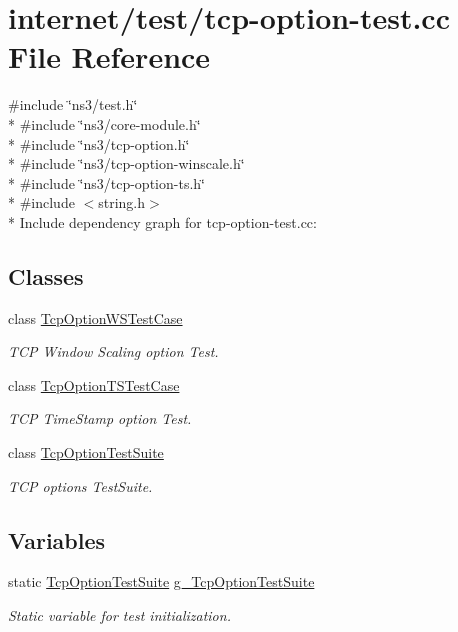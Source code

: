 \hypertarget{tcp-option-test_8cc}{}\section{internet/test/tcp-\/option-\/test.cc File Reference}
\label{tcp-option-test_8cc}
{\ttfamily \#include \char`\"{}ns3/test.\+h\char`\"{}}\\*
{\ttfamily \#include \char`\"{}ns3/core-\/module.\+h\char`\"{}}\\*
{\ttfamily \#include \char`\"{}ns3/tcp-\/option.\+h\char`\"{}}\\*
{\ttfamily \#include \char`\"{}ns3/tcp-\/option-\/winscale.\+h\char`\"{}}\\*
{\ttfamily \#include \char`\"{}ns3/tcp-\/option-\/ts.\+h\char`\"{}}\\*
{\ttfamily \#include $<$string.\+h$>$}\\*
Include dependency graph for tcp-\/option-\/test.cc\+:
\subsection*{Classes}
\begin{DoxyCompactItemize}
\item 
class \hyperlink{classTcpOptionWSTestCase}{Tcp\+Option\+W\+S\+Test\+Case}
\begin{DoxyCompactList}\small\item\em T\+CP Window Scaling option Test. \end{DoxyCompactList}\item 
class \hyperlink{classTcpOptionTSTestCase}{Tcp\+Option\+T\+S\+Test\+Case}
\begin{DoxyCompactList}\small\item\em T\+CP Time\+Stamp option Test. \end{DoxyCompactList}\item 
class \hyperlink{classTcpOptionTestSuite}{Tcp\+Option\+Test\+Suite}
\begin{DoxyCompactList}\small\item\em T\+CP options Test\+Suite. \end{DoxyCompactList}\end{DoxyCompactItemize}
\subsection*{Variables}
\begin{DoxyCompactItemize}
\item 
static \hyperlink{classTcpOptionTestSuite}{Tcp\+Option\+Test\+Suite} \hyperlink{tcp-option-test_8cc_a63d05e46c86f7744f22b6efa761766a2}{g\+\_\+\+Tcp\+Option\+Test\+Suite}
\begin{DoxyCompactList}\small\item\em Static variable for test initialization. \end{DoxyCompactList}\end{DoxyCompactItemize}


